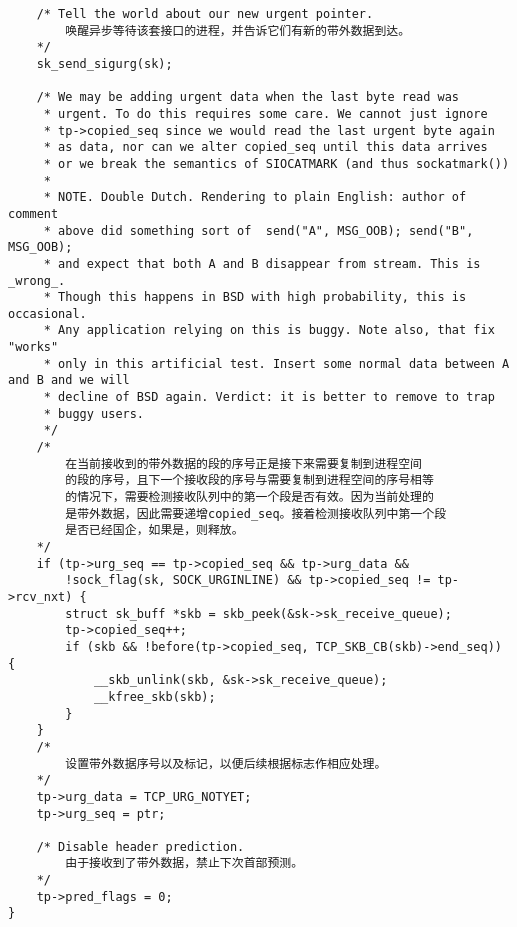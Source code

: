 \begin{verbatim}
	/* Tell the world about our new urgent pointer. 
		唤醒异步等待该套接口的进程，并告诉它们有新的带外数据到达。
	*/
	sk_send_sigurg(sk);

	/* We may be adding urgent data when the last byte read was
	 * urgent. To do this requires some care. We cannot just ignore
	 * tp->copied_seq since we would read the last urgent byte again
	 * as data, nor can we alter copied_seq until this data arrives
	 * or we break the semantics of SIOCATMARK (and thus sockatmark())
	 *
	 * NOTE. Double Dutch. Rendering to plain English: author of comment
	 * above did something sort of 	send("A", MSG_OOB); send("B", MSG_OOB);
	 * and expect that both A and B disappear from stream. This is _wrong_.
	 * Though this happens in BSD with high probability, this is occasional.
	 * Any application relying on this is buggy. Note also, that fix "works"
	 * only in this artificial test. Insert some normal data between A and B and we will
	 * decline of BSD again. Verdict: it is better to remove to trap
	 * buggy users.
	 */
	/*
		在当前接收到的带外数据的段的序号正是接下来需要复制到进程空间
		的段的序号，且下一个接收段的序号与需要复制到进程空间的序号相等
		的情况下，需要检测接收队列中的第一个段是否有效。因为当前处理的
		是带外数据，因此需要递增copied_seq。接着检测接收队列中第一个段
		是否已经国企，如果是，则释放。
	*/
	if (tp->urg_seq == tp->copied_seq && tp->urg_data &&
	    !sock_flag(sk, SOCK_URGINLINE) && tp->copied_seq != tp->rcv_nxt) {
		struct sk_buff *skb = skb_peek(&sk->sk_receive_queue);
		tp->copied_seq++;
		if (skb && !before(tp->copied_seq, TCP_SKB_CB(skb)->end_seq)) {
			__skb_unlink(skb, &sk->sk_receive_queue);
			__kfree_skb(skb);
		}
	}
	/*
		设置带外数据序号以及标记，以便后续根据标志作相应处理。
	*/
	tp->urg_data = TCP_URG_NOTYET;
	tp->urg_seq = ptr;

	/* Disable header prediction. 
		由于接收到了带外数据，禁止下次首部预测。	
	*/
	tp->pred_flags = 0;
}
\end{verbatim}
